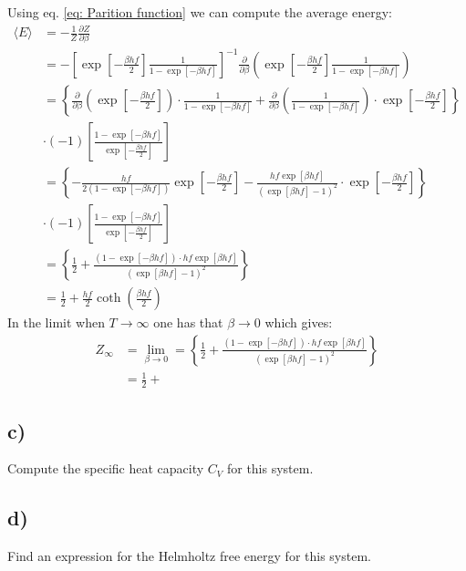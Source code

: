 \documentclass[a4paper]{article}
\newcommand{\average}[1]{\langle #1 \rangle}
\begin{document}
\vspace*{0.5cm}\noindent
Using eq. \eqref{eq: Parition function} we can compute the average energy:
\begin{align*}
   \average{E} &= -\frac{1}{Z}\frac{\partial Z}{\partial \beta}\\
   &= -\left[\exp\left[-\frac{\beta hf}{2}\right]\frac{1}{1-\exp\left[-\beta hf\right]}\right]^{-1}\frac{\partial}{\partial \beta}\left(\exp\left[-\frac{\beta hf}{2}\right]\frac{1}{1-\exp\left[-\beta hf\right]}\right)\\
   &= \left\{\frac{\partial}{\partial \beta}\left(\exp\left[-\frac{\beta hf}{2}\right]\right)\cdot \frac{1}{1-\exp\left[-\beta hf\right]}+\frac{\partial}{\partial \beta}\left(\frac{1}{1-\exp\left[-\beta hf\right]}\right)\cdot \exp\left[-\frac{\beta hf}{2}\right]\right\}\\
   &\cdot(-1)\left[\frac{1-\exp\left[-\beta hf\right]}{\exp\left[-\frac{\beta hf}{2}\right]}\right]\\
   &= \left\{-\frac{hf}{2\left(1-\exp\left[-\beta hf\right]\right)}\exp\left[-\frac{\beta hf}{2}\right] - \frac{hf\exp\left[\beta hf\right]}{\left(\exp\left[\beta hf\right] - 1\right)^2}\cdot\exp\left[-\frac{\beta hf}{2}\right]\right\}\\
   &\cdot(-1)\left[\frac{1-\exp\left[-\beta hf\right]}{\exp\left[-\frac{\beta hf}{2}\right]}\right]\\
   &= \left\{\frac{1}{2} + \frac{\left(1-\exp\left[-\beta hf\right]\right)\cdot hf \exp\left[\beta hf\right]}{\left(\exp\left[\beta hf\right] - 1\right)^2}\right\}\\
   &= \frac{1}{2} + \frac{hf}{2}\coth\left(\frac{\beta hf}{2}\right)
\end{align*}In the limit when $T\to\infty$ one has that $\beta\to0$ which gives:
\begin{align*}
    Z_\infty &= \lim_{\beta\to0} = \left\{\frac{1}{2} + \frac{\left(1-\exp\left[-\beta hf\right]\right)\cdot hf \exp\left[\beta hf\right]}{\left(\exp\left[\beta hf\right] - 1\right)^2}\right\}\\
    &=\frac{1}{2} + 
\end{align*}


\subsection*{c)}
Compute the specific heat capacity $C_V$ for this system.

\subsection*{d)}
Find an expression for the Helmholtz free energy for this system.
\end{document}
